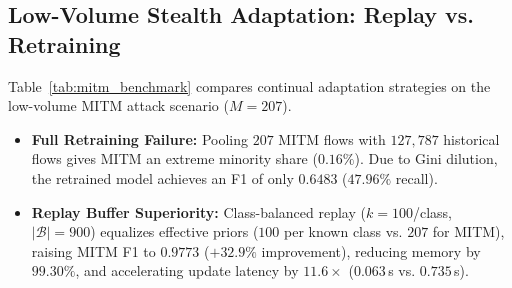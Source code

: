 \documentclass[conference]{IEEEtran}
\begin{document}
\subsection{Low-Volume Stealth Adaptation: Replay vs. Retraining}
Table~\ref{tab:mitm_benchmark} compares continual adaptation strategies on the low-volume MITM attack scenario ($M = 207$).
\begin{itemize}
    \item \textbf{Full Retraining Failure:} Pooling $207$ MITM flows with $127{,}787$ historical flows gives MITM an extreme minority share ($0.16\%$). Due to Gini dilution, the retrained model achieves an F1 of only $0.6483$ ($47.96\%$ recall).
    \item \textbf{Replay Buffer Superiority:} Class-balanced replay ($k=100$/class, $|\mathcal{B}|=900$) equalizes effective priors ($100$ per known class vs. $207$ for MITM), raising MITM F1 to $0.9773$ ($+32.9\%$ improvement), reducing memory by $99.30\%$, and accelerating update latency by $11.6\times$ ($0.063$\,s vs. $0.735$\,s).
\end{itemize}

\begin{table}[htbp]
\centering
\caption{Consolidated strategy benchmark on the low-volume MITM attack scenario ($M = 207$ adaptation flows, $832$ test flows).}
\label{tab:mitm_benchmark}
\end{table}
\end{document}
